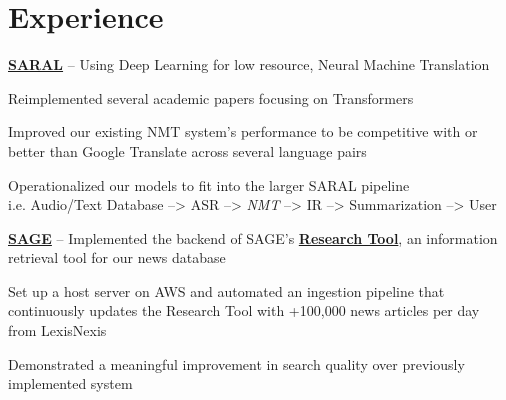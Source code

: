\documentclass[letterpaper]{deedy-resume} %
\begin{document}
\hfill
%
%
\begin{minipage}[t]{0.66\textwidth} %


\section{Experience}

\vspace{\topsep} %
\begin{tightitemize}
\item \href{https://viterbischool.usc.edu/news/2018/01/usc-isi-develop-translation-information-retrieval-system-uncommon-languages/}{\bf SARAL} -- Using Deep Learning for low resource, Neural Machine Translation 
\item Reimplemented several academic papers focusing on Transformers
\item Improved our existing NMT system's performance to be competitive with or better than Google Translate across several language pairs 
\item Operationalized our models to fit into the larger SARAL pipeline \\
i.e. Audio/Text Database --> ASR --> {\it NMT} --> IR --> Summarization --> User
\item \href{https://sage-platform.isi.edu}{\bf SAGE} -- Implemented the backend of SAGE's \href{http://54.153.12.18/research-tool/?referrer=rct&id=UXVlc3Rpb25Ob2RlOjMxMA==&token=eyJ0eXAiOiJKV1QiLCJhbGciOiJIUzI1NiJ9.eyJ1c2VyX2lkIjoxODExLCJ1c2VybmFtZSI6ImFkbWluIiwiZXhwIjoxNTYxODE3NTMzLCJlbWFpbCI6InNhZ2VAaXNpLmVkdSJ9.bFMd1C0R938hAJic-gzNEXTfI1bpZZW_VusjpXAommg}{\bf Research Tool}, an information retrieval tool for our news database
\item Set up a host server on AWS and automated an ingestion pipeline that continuously updates the Research Tool with +100,000 news articles per day from LexisNexis 
\item Demonstrated a meaningful improvement in search quality over previously implemented system 
\end{tightitemize}



\end{minipage}
\end{document}
